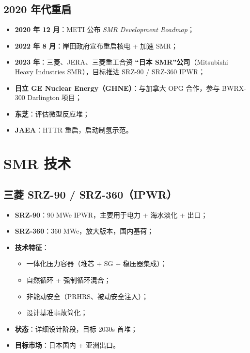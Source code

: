 \documentclass[
  UTF8,
  scheme=plain,
  fontsize=10pt,
  openany
]{ctexbook}
\begin{document}
\subsection{2020 年代重启}\label{ux5e74ux4ee3ux91cdux542f}

\begin{itemize}
\tightlist
\item
  \textbf{2020 年 12 月}：METI 公布 \emph{SMR Development Roadmap}；
\item
  \textbf{2022 年 8 月}：岸田政府宣布重启核电 + 加速 SMR；
\item
  \textbf{2023 年}：三菱、JERA、三菱重工合资 \textbf{``日本
  SMR''公司}（Mitsubishi Heavy Industries SMR），目标推进 SRZ-90 /
  SRZ-360 IPWR；
\item
  \textbf{日立 GE Nuclear Energy（GHNE）}：与加拿大 OPG 合作，参与
  BWRX-300 Darlington 项目；
\item
  \textbf{东芝}：评估微型反应堆；
\item
  \textbf{JAEA}：HTTR 重启，启动制氢示范。
\end{itemize}

\section{SMR 技术}\label{smr-ux6280ux672f}

\subsection{三菱 SRZ-90 /
SRZ-360（IPWR）}\label{ux4e09ux83f1-srz-90-srz-360ipwr}

\begin{itemize}
\tightlist
\item
  \textbf{SRZ-90}：90 MWe IPWR，主要用于电力 + 海水淡化 + 出口；
\item
  \textbf{SRZ-360}：360 MWe，放大版本，国内基荷；
\item
  \textbf{技术特征}：

  \begin{itemize}
  \tightlist
  \item
    一体化压力容器（堆芯 + SG + 稳压器集成）；
  \item
    自然循环 + 强制循环混合；
  \item
    非能动安全（PRHRS、被动安全注入）；
  \item
    设计基准事故简化；
  \end{itemize}
\item
  \textbf{状态}：详细设计阶段，目标 2030s 首堆；
\item
  \textbf{目标市场}：日本国内 + 亚洲出口。
\end{itemize}
\end{document}
